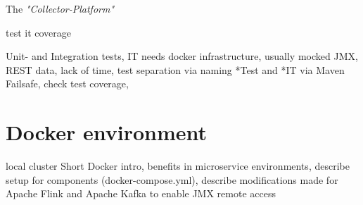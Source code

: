 The \textit{"Collector-Platform"}

test
it
coverage



%
%
%

Unit- and Integration tests, IT needs docker infrastructure, usually mocked JMX, REST data,
lack of time, test separation via naming *Test and *IT via Maven Failsafe, check test coverage,
%

\section{Docker environment}

local cluster
Short Docker intro, benefits in microservice environments, describe setup for components (docker-compose.yml),
describe modifications made for Apache Flink and Apache Kafka to enable JMX remote access

